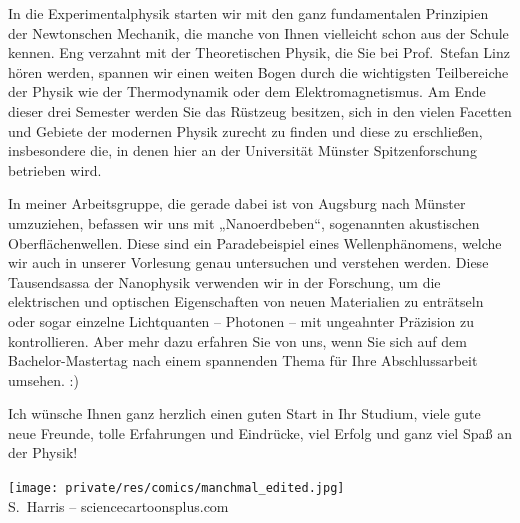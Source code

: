 \begin{multicols}{2}
In die Experimentalphysik starten wir mit den ganz fundamentalen Prinzipien der Newtonschen Mechanik, die manche von Ihnen vielleicht schon aus der Schule kennen. Eng verzahnt mit der Theoretischen Physik, die Sie bei Prof.\ Stefan Linz hören werden, spannen wir einen weiten Bogen durch die wichtigsten Teilbereiche der Physik wie der Thermodynamik oder dem Elektromagnetismus. Am Ende dieser drei Semester werden Sie das Rüstzeug besitzen, sich in den vielen Facetten und Gebiete der modernen Physik zurecht zu finden und diese zu erschließen, insbesondere die, in denen hier an der Universität Münster Spitzenforschung betrieben wird.

In meiner Arbeitsgruppe, die gerade dabei ist von Augsburg nach Münster umzuziehen, befassen wir uns mit „Nanoerdbeben“, sogenannten akustischen Oberflächenwellen. Diese sind ein Paradebeispiel eines Wellenphänomens, welche wir auch in unserer Vorlesung genau untersuchen und verstehen werden. Diese Tausendsassa der Nanophysik verwenden wir in der Forschung, um die elektrischen und optischen Eigenschaften von neuen Materialien zu enträtseln oder sogar einzelne Lichtquanten -- Photonen -- mit ungeahnter Präzision zu kontrollieren. Aber mehr dazu erfahren Sie von uns, wenn Sie sich auf dem Bachelor-Mastertag nach einem spannenden Thema für Ihre Abschlussarbeit umsehen. :)

Ich wünsche Ihnen ganz herzlich einen guten Start in Ihr Studium, viele gute neue Freunde, tolle Erfahrungen und Eindrücke, viel Erfolg und ganz viel Spaß an der Physik!

\begin{center}
\texttt{[image: private/res/comics/manchmal\_edited.jpg]}\\
{\footnotesize 
S.~Harris – sciencecartoonsplus.com}
\end{center}

\end{multicols}

\vfill

\newpage

\vspace*{\fill}

